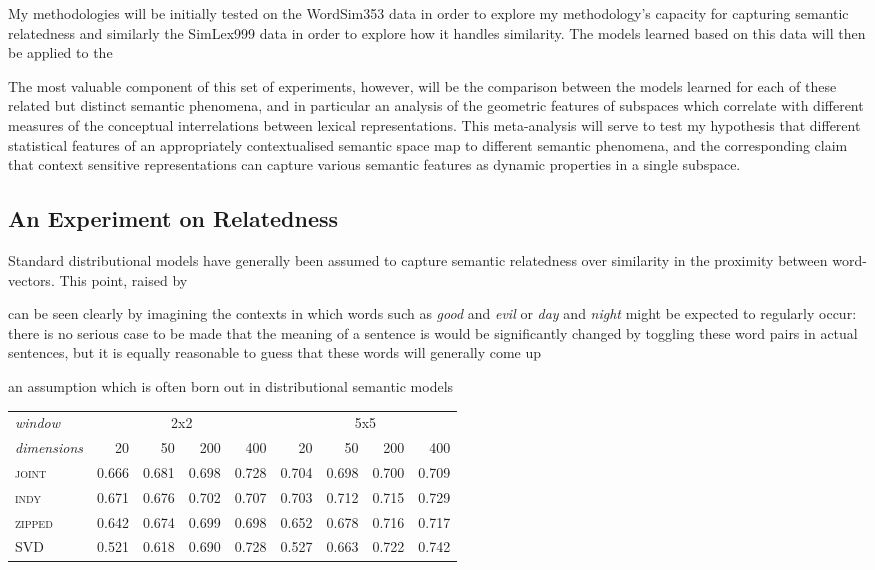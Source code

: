 My methodologies will be initially tested on the WordSim353 data \cite{FinkelsteinEA2002} in order to explore my methodology's capacity for capturing semantic relatedness and similarly the SimLex999 data \cite{HillEA2012} in order to explore how it handles similarity.  The models learned based on this data will then be applied to the 

The most valuable component of this set of experiments, however, will be the comparison between the models learned for each of these related but distinct semantic phenomena, and in particular an analysis of the geometric features of subspaces which correlate with different measures of the conceptual interrelations between lexical representations.  This meta-analysis will serve to test my hypothesis that different statistical features of an appropriately contextualised semantic space map to different semantic phenomena, and the corresponding claim that context sensitive representations can capture various semantic features as dynamic properties in a single subspace.

\subsection{An Experiment on Relatedness}
Standard distributional models have generally been assumed to capture semantic relatedness over similarity in the proximity between word-vectors.  This point, raised by

can be seen clearly by imagining the contexts in which words such as \emph{good} and \emph{evil} or \emph{day} and \emph{night} might be expected to regularly occur: there is no serious case to be made that the meaning of a sentence is would be significantly changed by toggling these word pairs in actual sentences, but it is equally reasonable to guess that these words will generally come up 

an assumption which is often born out in distributional semantic models

\begin{table}
\centering
\begin{tabular}{lrrrrrrrr}
\hline
\emph{window} & \multicolumn{4}{c}{2x2} & \multicolumn{4}{c}{5x5} \\
\emph{dimensions} & 20 & 50 & 200 & 400 & 20 & 50 & 200 & 400 \\
\hline
\textsc{joint} & 0.666 & 0.681 & 0.698 & 0.728 & 0.704 & 0.698 & 0.700 & 0.709 \\
\textsc{indy} & 0.671 & 0.676 & 0.702 & 0.707 & 0.703 & 0.712 & 0.715 & 0.729 \\
\textsc{zipped} & 0.642 & 0.674 & 0.699 & 0.698 & 0.652 & 0.678 & 0.716 & 0.717 \\
\textsc{SVD} & 0.521 & 0.618 & 0.690 & 0.728 & 0.527 & 0.663 & 0.722 & 0.742 \\
\end{tabular}
\end{table}

